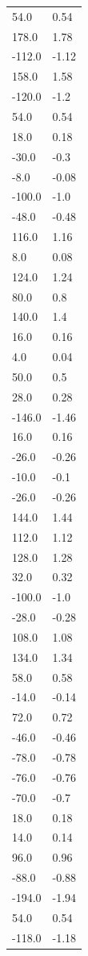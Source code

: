 \begin{longtable}{ll}
54.0 & 0.54 \\
178.0 & 1.78 \\
-112.0 & -1.12 \\
158.0 & 1.58 \\
-120.0 & -1.2 \\
54.0 & 0.54 \\
18.0 & 0.18 \\
-30.0 & -0.3 \\
-8.0 & -0.08 \\
-100.0 & -1.0 \\
-48.0 & -0.48 \\
116.0 & 1.16 \\
8.0 & 0.08 \\
124.0 & 1.24 \\
80.0 & 0.8 \\
140.0 & 1.4 \\
16.0 & 0.16 \\
4.0 & 0.04 \\
50.0 & 0.5 \\
28.0 & 0.28 \\
-146.0 & -1.46 \\
16.0 & 0.16 \\
-26.0 & -0.26 \\
-10.0 & -0.1 \\
-26.0 & -0.26 \\
144.0 & 1.44 \\
112.0 & 1.12 \\
128.0 & 1.28 \\
32.0 & 0.32 \\
-100.0 & -1.0 \\
-28.0 & -0.28 \\
108.0 & 1.08 \\
134.0 & 1.34 \\
58.0 & 0.58 \\
-14.0 & -0.14 \\
72.0 & 0.72 \\
-46.0 & -0.46 \\
-78.0 & -0.78 \\
-76.0 & -0.76 \\
-70.0 & -0.7 \\
18.0 & 0.18 \\
14.0 & 0.14 \\
96.0 & 0.96 \\
-88.0 & -0.88 \\
-194.0 & -1.94 \\
54.0 & 0.54 \\
-118.0 & -1.18 \\

\end{longtable}
